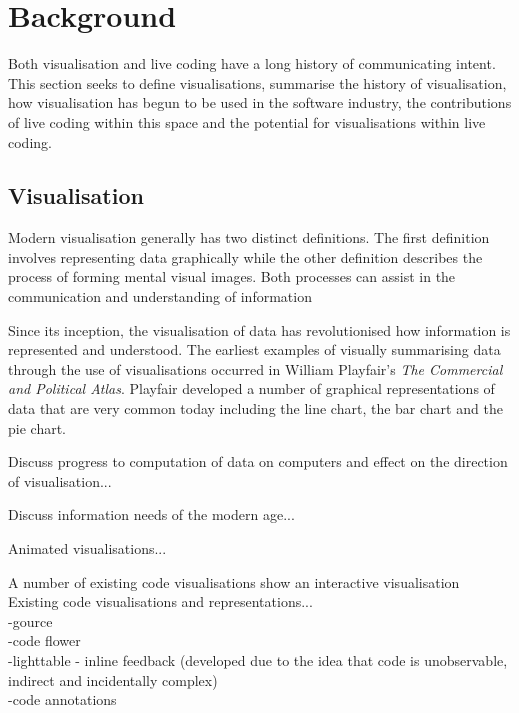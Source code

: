 \section{Background}

Both visualisation and live coding have a long history of communicating intent. This section seeks to define visualisations, summarise the history of visualisation, how visualisation has begun to be used in the software industry, the contributions of live coding within this space and the potential for visualisations within live coding.

\subsection{Visualisation}

Modern visualisation generally has two distinct definitions. The first definition involves representing data graphically while the other definition describes the process of forming mental visual images. {\color{red} Both processes can assist in the communication and understanding of information}

Since its inception, the visualisation of data has revolutionised how information is represented and understood. The earliest examples of visually summarising data through the use of visualisations occurred in William Playfair's \textit{The Commercial and Political Atlas}. Playfair developed a number of graphical representations of data that are very common today including the line chart, the bar chart and the pie chart.


Discuss progress to computation of data on computers and effect on the direction of visualisation...

Discuss information needs of the modern age...



Animated visualisations...

A number of existing code visualisations show an interactive visualisation Existing code visualisations and representations...\\
-gource~\cite{Caudwell2010}\\
-code flower\\
-lighttable - inline feedback (developed due to the idea that code is unobservable, indirect and incidentally complex) \\
-code annotations~\cite{Swift2013}

